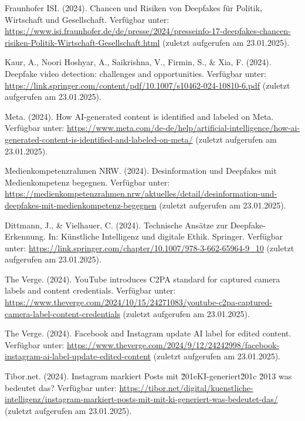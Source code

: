 \documentclass[a4paper,12pt]{article}
\begin{document}
\begin{thebibliography}{99}
     Fraunhofer ISI. (2024). Chancen und Risiken von Deepfakes für Politik, Wirtschaft und Gesellschaft. 
    Verfügbar unter: \url{https://www.isi.fraunhofer.de/de/presse/2024/presseinfo-17-deepfakes-chancen-risiken-Politik-Wirtschaft-Gesellschaft.html} (zuletzt aufgerufen am 23.01.2025). 
    
     Kaur, A., Noori Hoshyar, A., Saikrishna, V., Firmin, S., \& Xia, F. (2024). Deepfake video detection: challenges and opportunities. 
    Verfügbar unter: \url{https://link.springer.com/content/pdf/10.1007/s10462-024-10810-6.pdf} (zuletzt aufgerufen am 23.01.2025).
    
     Meta. (2024). How AI-generated content is identified and labeled on Meta. 
    Verfügbar unter: \url{https://www.meta.com/de-de/help/artificial-intelligence/how-ai-generated-content-is-identified-and-labeled-on-meta/} (zuletzt aufgerufen am 23.01.2025).
    
     Medienkompetenzrahmen NRW. (2024). Desinformation und Deepfakes mit Medienkompetenz begegnen. 
    Verfügbar unter: \url{https://medienkompetenzrahmen.nrw/aktuelles/detail/desinformation-und-deepfakes-mit-medienkompetenz-begegnen} (zuletzt aufgerufen am 23.01.2025).
    
     Dittmann, J., \& Vielhauer, C. (2024). Technische Ansätze zur Deepfake-Erkennung. In: Künstliche Intelligenz und digitale Ethik. Springer. 
    Verfügbar unter: \url{https://link.springer.com/chapter/10.1007/978-3-662-65964-9_10} (zuletzt aufgerufen am 23.01.2025).
    
     The Verge. (2024). YouTube introduces C2PA standard for captured camera labels and content credentials. 
    Verfügbar unter: \url{https://www.theverge.com/2024/10/15/24271083/youtube-c2pa-captured-camera-label-content-credentials} (zuletzt aufgerufen am 23.01.2025).
    
     The Verge. (2024). Facebook and Instagram update AI label for edited content. 
    Verfügbar unter: \url{https://www.theverge.com/2024/9/12/24242998/facebook-instagram-ai-label-update-edited-content} (zuletzt aufgerufen am 23.01.2025).
    
     Tibor.net. (2024). Instagram markiert Posts mit \u201eKI-generiert\u201c \u2013 was bedeutet das? 
    Verfügbar unter: \url{https://tibor.net/digital/kuenstliche-intelligenz/instagram-markiert-posts-mit-mit-ki-generiert-was-bedeutet-das/} (zuletzt aufgerufen am 23.01.2025).
    

\end{thebibliography}
\end{document}
